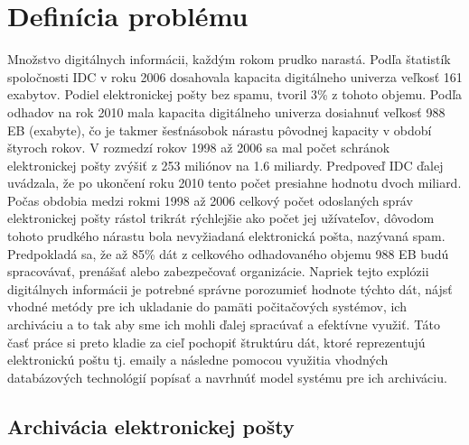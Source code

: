 \documentclass[11pt,twoside,a4paper]{book}
\begin{document}
\chapter{Definícia problému}

Množstvo digitálnych informácii, každým rokom prudko narastá. Podľa štatistík spoločnosti IDC \cite{digitalUniverse} v roku 2006 dosahovala kapacita digitálneho univerza veľkosť 161 exabytov. Podiel elektronickej pošty bez spamu, tvoril 3\% z tohoto objemu. Podľa odhadov na rok 2010 mala kapacita digitálneho univerza dosiahnuť veľkosť 988 EB (exabyte), čo je takmer šesťnásobok nárastu pôvodnej kapacity v období štyroch rokov. V rozmedzí rokov 1998 až 2006 sa mal počet schránok elektronickej pošty zvýšiť z 253 miliónov na 1.6 miliardy. Predpoveď IDC ďalej uvádzala, že po ukončení roku 2010 tento počet presiahne hodnotu dvoch miliard. Počas obdobia medzi rokmi 1998 až 2006 celkový počet odoslaných správ elektronickej pošty rástol trikrát rýchlejšie ako počet jej užívateľov, dôvodom tohoto prudkého nárastu bola nevyžiadaná elektronická pošta, nazývaná spam. Predpokladá sa, že až 85\% dát z celkového odhadovaného objemu 988 EB budú spracovávať, prenášať alebo zabezpečovať organizácie. Napriek tejto explózii digitálnych informácii je potrebné správne porozumieť hodnote týchto dát, nájsť vhodné metódy pre ich ukladanie do pamäti počitačových systémov, ich archiváciu a to tak aby sme ich mohli ďalej spracúvať a efektívne využiť. Táto časť práce si preto kladie za cieľ pochopiť štruktúru dát, ktoré reprezentujú elektronickú poštu tj. emaily a následne pomocou využitia vhodných databázových technológií popísať a navrhnúť model systému pre ich archiváciu.

\section{Archivácia elektronickej pošty}
\end{document}
